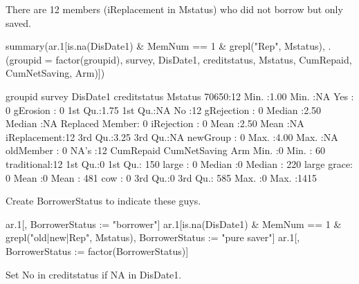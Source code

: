 There are 12 members (\textsf{iReplacement} in \textsf{Mstatus}) who did not borrow but only saved. 
\begin{Schunk}
\begin{Sinput}
summary(ar.1[is.na(DisDate1) & MemNum == 1 & grepl("Rep", Mstatus), 
  .(groupid = factor(groupid), survey, DisDate1, creditstatus, 
    Mstatus, CumRepaid, CumNetSaving, Arm)])
\end{Sinput}
\begin{Soutput}
  groupid       survey        DisDate1           creditstatus         Mstatus  
 70650:12   Min.   :1.00   Min.   :NA   Yes            : 0    gErosion    : 0  
            1st Qu.:1.75   1st Qu.:NA   No             :12    gRejection  : 0  
            Median :2.50   Median :NA   Replaced Member: 0    iRejection  : 0  
            Mean   :2.50   Mean   :NA                         iReplacement:12  
            3rd Qu.:3.25   3rd Qu.:NA                         newGroup    : 0  
            Max.   :4.00   Max.   :NA                         oldMember   : 0  
                           NA's   :12                                          
   CumRepaid  CumNetSaving           Arm    
 Min.   :0   Min.   :  60   traditional:12  
 1st Qu.:0   1st Qu.: 150   large      : 0  
 Median :0   Median : 220   large grace: 0  
 Mean   :0   Mean   : 481   cow        : 0  
 3rd Qu.:0   3rd Qu.: 585                   
 Max.   :0   Max.   :1415                   
                                            
\end{Soutput}
\end{Schunk}
Create \textsf{BorrowerStatus} to indicate these guys. \gobblepars
\begin{Schunk}
\begin{Sinput}
ar.1[, BorrowerStatus := "borrower"]
ar.1[is.na(DisDate1) & MemNum == 1 & grepl("old|new|Rep", Mstatus), 
  BorrowerStatus := "pure saver"]
ar.1[, BorrowerStatus := factor(BorrowerStatus)]
\end{Sinput}
\end{Schunk}
Set \textsf{No} in \textsf{creditstatus} if NA in \textsf{DisDate1}.

